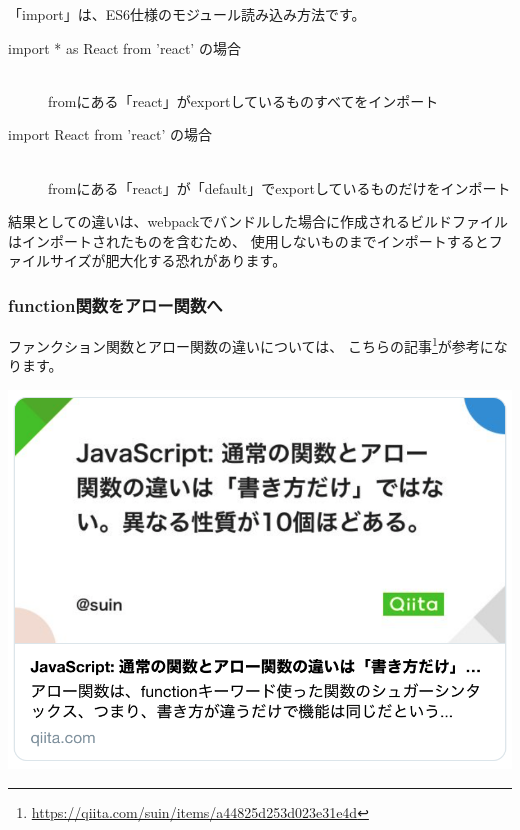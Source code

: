 「import」は、ES6仕様のモジュール読み込み方法です。

\vspace*{\baselineskip}

\begin{description}
\item[import * as React from 'react' の場合] \mbox{} \\
fromにある「react」がexportしているものすべてをインポート
\item[import React from 'react' の場合] \mbox{} \\
fromにある「react」が「default」でexportしているものだけをインポート
\end{description}

\vspace*{\baselineskip}

結果としての違いは、webpackでバンドルした場合に作成されるビルドファイルはインポートされたものを含むため、
使用しないものまでインポートするとファイルサイズが肥大化する恐れがあります。

\subsubsection*{function関数をアロー関数へ}
\keeplastskip{
  \label{sec:3-3-4-2}
  \label{sec-00332-2}
  \par\nobreak
}

ファンクション関数とアロー関数の違いについては、
こちらの記事\footnote{\url{https://qiita.com/suin/items/a44825d253d023e31e4d}}が参考になります。

\begin{reviewimage}%
\includegraphics[width=0.5\maxwidth]{./images/03-todo-with-react/sec00332-1-01.png}%
\label{image:03-todo-with-react:sec00332-1-01}
\end{reviewimage}


